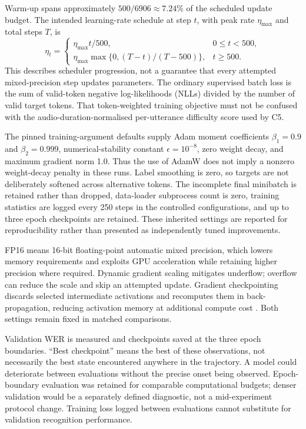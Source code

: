 \documentclass[12pt,a4paper]{report}
\begin{document}
Warm-up spans approximately $500/6906\approx7.24\%$ of the scheduled update budget. The intended learning-rate schedule at step $t$, with peak rate $\eta_{\max}$ and total steps $T$, is
\begin{equation}
\eta_t=\begin{cases}
\eta_{\max}t/500,&0\leq t<500,\\
\eta_{\max}\max\{0,(T-t)/(T-500)\},&t\geq500.
\end{cases}
\end{equation}
This describes scheduler progression, not a guarantee that every attempted mixed-precision step updates parameters. The ordinary supervised batch loss is the sum of valid-token negative log-likelihoods (NLLs) divided by the number of valid target tokens. That token-weighted training objective must not be confused with the audio-duration-normalised per-utterance difficulty score used by C5.

The pinned training-argument defaults supply Adam moment coefficients $\beta_1=0.9$ and $\beta_2=0.999$, numerical-stability constant $\epsilon=10^{-8}$, zero weight decay, and maximum gradient norm 1.0. Thus the use of AdamW does not imply a nonzero weight-decay penalty in these runs. Label smoothing is zero, so targets are not deliberately softened across alternative tokens. The incomplete final minibatch is retained rather than dropped, data-loader subprocess count is zero, training statistics are logged every 250 steps in the controlled configurations, and up to three epoch checkpoints are retained. These inherited settings are reported for reproducibility rather than presented as independently tuned improvements.

FP16 means 16-bit floating-point automatic mixed precision, which lowers memory requirements and exploits GPU acceleration while retaining higher precision where required. Dynamic gradient scaling mitigates underflow; overflow can reduce the scale and skip an attempted update. Gradient checkpointing discards selected intermediate activations and recomputes them in back-propagation, reducing activation memory at additional compute cost \citep{Micikevicius2018,Chen2016}. Both settings remain fixed in matched comparisons.

Validation WER is measured and checkpoints saved at the three epoch boundaries. ``Best checkpoint'' means the best of these observations, not necessarily the best state encountered anywhere in the trajectory. A model could deteriorate between evaluations without the precise onset being observed. Epoch-boundary evaluation was retained for comparable computational budgets; denser validation would be a separately defined diagnostic, not a mid-experiment protocol change. Training loss logged between evaluations cannot substitute for validation recognition performance.
\end{document}
